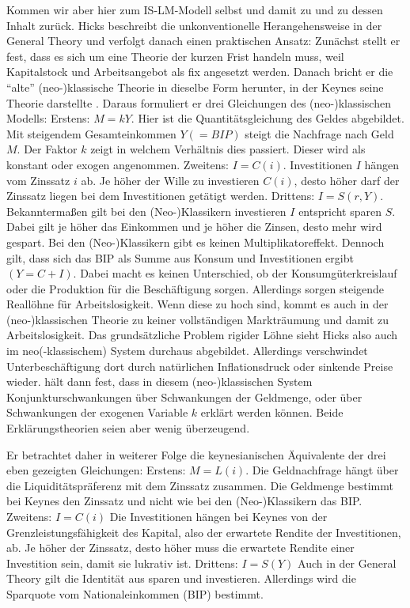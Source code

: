 Kommen wir aber hier zum IS-LM-Modell selbst und damit zu \textcite{Hicks1937} und zu dessen Inhalt zurück. Hicks beschreibt die unkonventionelle Herangehensweise in der General Theory und verfolgt danach einen praktischen Ansatz: Zunächst stellt er fest, dass es sich um eine Theorie der kurzen Frist handeln muss, weil Kapitalstock und Arbeitsangebot als fix angesetzt werden. Danach bricht er die "`alte"' (neo-)klassische Theorie in dieselbe Form herunter, in der Keynes seine Theorie darstellte \parencite[S. 148]{Hicks1937}. Daraus formuliert er drei Gleichungen des (neo-)klassischen Modells:
Erstens: $M = kY$. Hier ist die Quantitätsgleichung des Geldes abgebildet. Mit steigendem Gesamteinkommen $Y (=BIP)$ steigt die Nachfrage nach Geld $M$. Der Faktor $k$ zeigt in welchem Verhältnis dies passiert. Dieser wird als konstant oder exogen angenommen.
Zweitens: $I = C(i)$. Investitionen $I$ hängen vom Zinssatz $i$ ab. Je höher der Wille zu investieren $C(i)$, desto höher darf der Zinssatz liegen bei dem Investitionen getätigt werden.
Drittens: $I = S(r,Y)$. Bekanntermaßen gilt bei den (Neo-)Klassikern investieren $I$ entspricht sparen $S$. Dabei gilt je höher das Einkommen und je höher die Zinsen, desto mehr wird gespart.
Bei den (Neo-)Klassikern gibt es keinen Multiplikatoreffekt. Dennoch gilt, dass sich das BIP als Summe aus Konsum und Investitionen ergibt $(Y = C + I)$. Dabei macht es keinen Unterschied, ob der Konsumgüterkreislauf oder die Produktion für die Beschäftigung sorgen. Allerdings sorgen steigende Reallöhne für Arbeitslosigkeit. Wenn diese zu hoch sind, kommt es auch in der (neo-)klassischen Theorie zu keiner vollständigen Markträumung und damit zu Arbeitslosigkeit. Das grundsätzliche Problem rigider Löhne sieht Hicks also auch im neo(-klassischem) System durchaus abgebildet. Allerdings verschwindet Unterbeschäftigung dort durch natürlichen Inflationsdruck oder sinkende Preise wieder. \textcite[S. 150ff]{Hicks1937} hält dann fest, dass in diesem (neo-)klassischen System Konjunkturschwankungen über Schwankungen der Geldmenge, oder über Schwankungen der exogenen Variable $k$ erklärt werden können. Beide Erklärungstheorien seien aber wenig überzeugend. 

Er betrachtet daher in weiterer Folge die keynesianischen Äquivalente der drei eben gezeigten Gleichungen:
Erstens: $M = L(i)$. Die Geldnachfrage hängt über die Liquiditätspräferenz mit dem Zinssatz zusammen. Die Geldmenge bestimmt bei Keynes den Zinssatz und nicht wie bei den (Neo-)Klassikern das BIP.
Zweitens: $I = C(i)$ Die Investitionen hängen bei Keynes von der Grenzleistungsfähigkeit des Kapital, also der erwartete Rendite der Investitionen, ab. Je höher der Zinssatz, desto höher muss die erwartete Rendite einer Investition sein, damit sie lukrativ ist.
Drittens: $I = S(Y)$ Auch in der General Theory gilt die Identität aus sparen und investieren. Allerdings wird die Sparquote vom Nationaleinkommen (BIP) bestimmt.


